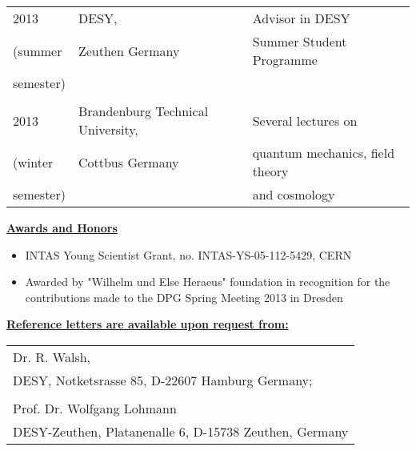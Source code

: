 {{\begin{tabular}{lll}
2013                 & DESY,                          & Advisor in   DESY                \\
(summer              &  Zeuthen Germany               & Summer Student Programme          \\
semester)	     &				      &  	                           \\
                     &                                &                                    \\
2013                 & Brandenburg Technical University,  & Several lectures on                \\
(winter              &  Cottbus Germany                   & quantum mechanics, field theory       \\
semester)	     &				      &  and cosmology 	         \\



\end{tabular}



\begin{center}{\bf{\underline{Awards and Honors}}}\end{center}
%
\begin{itemize}
\item{INTAS Young Scientist Grant, no. INTAS-YS-05-112-5429, CERN} 
\item{Awarded by "Wilhelm und Else Heraeus" foundation  in recognition for the contributions made to the  
DPG Spring Meeting 2013 in Dresden }
\end{itemize}

\vspace{1mm}

\begin{center}{\bf{{\underline{Reference letters are available upon request from:}}}}\end{center} 

\begin{tabular}{l}
Dr. R. Walsh, \\
DESY, Notketsrasse 85, D-22607 Hamburg Germany; \\
\\
Prof. Dr. Wolfgang Lohmann \\
DESY-Zeuthen, Platanenalle 6, D-15738 Zeuthen, Germany \\
\end{tabular}

}}

